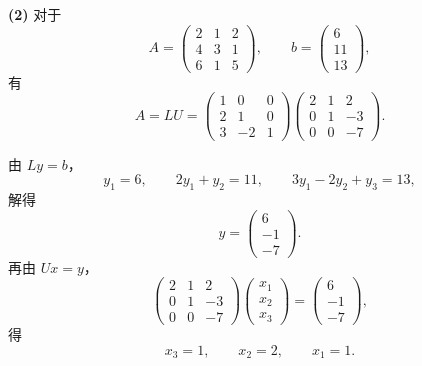 \documentclass[11pt, a4paper]{ctexart}
\begin{document}
\begin{solution}
    \vspace{1em}
    \textbf{(2)} 对于
    \[
        A =
        \begin{pmatrix}
            2 & 1 & 2 \\
            4 & 3 & 1 \\
            6 & 1 & 5
        \end{pmatrix},
        \qquad
        b =
        \begin{pmatrix}
            6 \\
            11 \\
            13
        \end{pmatrix},
    \]
    有
    \[
        A = LU =
        \begin{pmatrix}
            1 & 0 & 0 \\
            2 & 1 & 0 \\
            3 & -2 & 1
        \end{pmatrix}
        \begin{pmatrix}
            2 & 1 & 2 \\
            0 & 1 & -3 \\
            0 & 0 & -7
        \end{pmatrix}.
    \]

    由 $Ly = b$，
    \[
        y_1 = 6,\qquad
        2y_1 + y_2 = 11,\qquad
        3y_1 - 2y_2 + y_3 = 13,
    \]
    解得
    \[
        y =
        \begin{pmatrix}
            6 \\
            -1 \\
            -7
        \end{pmatrix}.
    \]
    再由 $Ux = y$，
    \[
        \begin{pmatrix}
            2 & 1 & 2 \\
            0 & 1 & -3 \\
            0 & 0 & -7
        \end{pmatrix}
        \begin{pmatrix}
            x_1 \\
            x_2 \\
            x_3
        \end{pmatrix}
        =
        \begin{pmatrix}
            6 \\
            -1 \\
            -7
        \end{pmatrix},
    \]
    得
    \[
        x_3 = 1,\qquad x_2 = 2,\qquad x_1 = 1.
    \]
\end{solution}
\end{document}
